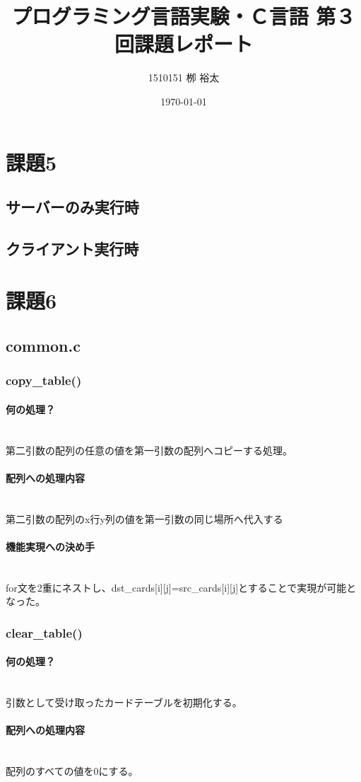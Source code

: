 \documentclass[11pt,a4paper, uplatex]{jsarticle}
\title{プログラミング言語実験・Ｃ言語 第３回課題レポート}
\author{1510151  栁 裕太}
\date{\today}
\begin{document}
\section{課題5}
%
\subsection{サーバーのみ実行時}
%
\subsection{クライアント実行時}
%
\section{課題6}
%
\subsection{common.c}
%
\subsubsection{copy\_table()}
\paragraph{何の処理？}\mbox{}\\
第二引数の配列の任意の値を第一引数の配列へコピーする処理。
\paragraph{配列への処理内容}\mbox{}\\
第二引数の配列のx行y列の値を第一引数の同じ場所へ代入する
\paragraph{機能実現への決め手}\mbox{}\\
for文を2重にネストし、dst\_cards[i][j]=src\_cards[i][j]とすることで実現が可能となった。
%
\subsubsection{clear\_table()}
\paragraph{何の処理？}\mbox{}\\
引数として受け取ったカードテーブルを初期化する。
\paragraph{配列への処理内容}\mbox{}\\
配列のすべての値を0にする。
\end{document}
